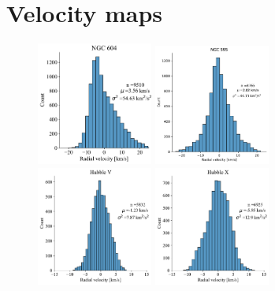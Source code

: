 \documentclass[fleqn,usenatbib, useAMS, a4paper]{mnras}
\begin{document}
\appendix

\section{Velocity maps}\label{sec:VelMaps}

\begin{figure}
\centering
\begin{multicols}{4}
\includegraphics[width=1.5in]{Figures/Hist/604}\par
\includegraphics[width=1.5in]{Figures/Hist/595.pdf}\par
\includegraphics[width=1.5in]{Figures/Hist/Hubble V.pdf}\par
\includegraphics[width=1.5in]{Figures/Hist/Hubble X.pdf}\par
\end{multicols}
\begin{multicols}{4}

\end{multicols}
\end{figure}
\end{document}
